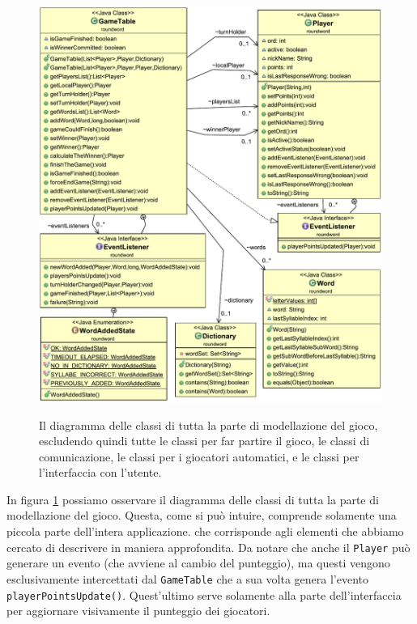 \documentclass[10.5pt]{article}
\begin{document}
\begin{figure}
	\vspace*{-1in}
	\begin{center}
		\hspace*{-0.5in}
		\includegraphics[scale=0.95]{imgs/ClassDiagram1.pdf}
		\label{fig:class_diagram1}
		\caption{Il diagramma delle classi di tutta la parte di modellazione del gioco, escludendo quindi tutte le classi per far partire il gioco, le classi di comunicazione, le classi per i giocatori automatici, e le classi per l'interfaccia con l'utente.}
	\end{center}
\end{figure}

In figura \ref{fig:class_diagram1} possiamo osservare il diagramma delle classi di tutta la parte di modellazione del gioco. Questa, come si può intuire, comprende solamente una piccola parte dell'intera applicazione. che corrisponde agli elementi che abbiamo cercato di descrivere in maniera approfondita. Da notare che anche il \texttt{Player} può generare un evento (che avviene al cambio del punteggio), ma questi vengono esclusivamente intercettati dal \texttt{GameTable} che a sua volta genera l'evento \texttt{playerPointsUpdate()}. Quest'ultimo serve solamente alla parte dell'interfaccia per aggiornare visivamente il punteggio dei giocatori.
\end{document}

